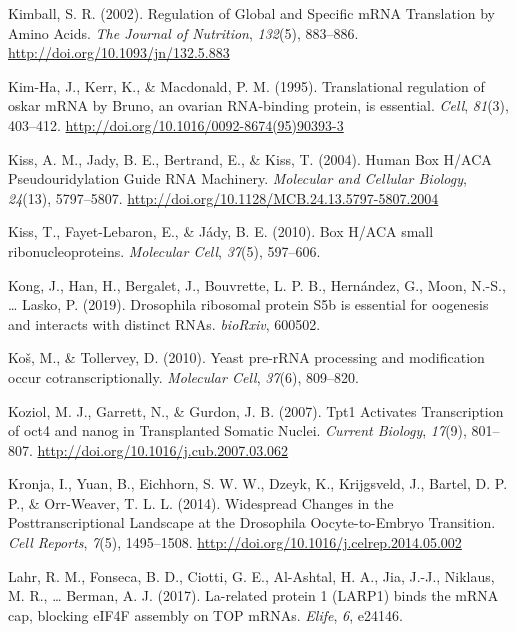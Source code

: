 \documentclass[12pt,twoside]{reedthesis}
\newlength{\cslhangindent}
\newenvironment{cslreferences}%
  {\setlength{\parindent}{0pt}%
  \everypar{\setlength{\hangindent}{\cslhangindent}}\ignorespaces}%
  {\par}
\begin{document}
\begin{cslreferences}
\leavevmode\hypertarget{ref-kimballRegulationGlobalSpecific2002}{}%
Kimball, S. R. (2002). Regulation of Global and Specific mRNA Translation by Amino Acids. \emph{The Journal of Nutrition}, \emph{132}(5), 883--886. \url{http://doi.org/10.1093/jn/132.5.883}

\leavevmode\hypertarget{ref-Kim-Ha1995i}{}%
Kim-Ha, J., Kerr, K., \& Macdonald, P. M. (1995). Translational regulation of oskar mRNA by Bruno, an ovarian RNA-binding protein, is essential. \emph{Cell}, \emph{81}(3), 403--412. \url{http://doi.org/10.1016/0092-8674(95)90393-3}

\leavevmode\hypertarget{ref-Kiss2004c}{}%
Kiss, A. M., Jady, B. E., Bertrand, E., \& Kiss, T. (2004). Human Box H/ACA Pseudouridylation Guide RNA Machinery. \emph{Molecular and Cellular Biology}, \emph{24}(13), 5797--5807. \url{http://doi.org/10.1128/MCB.24.13.5797-5807.2004}

\leavevmode\hypertarget{ref-Kiss2010}{}%
Kiss, T., Fayet-Lebaron, E., \& Jády, B. E. (2010). Box H/ACA small ribonucleoproteins. \emph{Molecular Cell}, \emph{37}(5), 597--606.

\leavevmode\hypertarget{ref-Kong2019}{}%
Kong, J., Han, H., Bergalet, J., Bouvrette, L. P. B., Hernández, G., Moon, N.-S., \ldots{} Lasko, P. (2019). Drosophila ribosomal protein S5b is essential for oogenesis and interacts with distinct RNAs. \emph{bioRxiv}, 600502.

\leavevmode\hypertarget{ref-Kos2010}{}%
Koš, M., \& Tollervey, D. (2010). Yeast pre-rRNA processing and modification occur cotranscriptionally. \emph{Molecular Cell}, \emph{37}(6), 809--820.

\leavevmode\hypertarget{ref-koziolTpt1ActivatesTranscription2007}{}%
Koziol, M. J., Garrett, N., \& Gurdon, J. B. (2007). Tpt1 Activates Transcription of oct4 and nanog in Transplanted Somatic Nuclei. \emph{Current Biology}, \emph{17}(9), 801--807. \url{http://doi.org/10.1016/j.cub.2007.03.062}

\leavevmode\hypertarget{ref-Kronja2014}{}%
Kronja, I., Yuan, B., Eichhorn, S. W. W., Dzeyk, K., Krijgsveld, J., Bartel, D. P. P., \& Orr-Weaver, T. L. L. (2014). Widespread Changes in the Posttranscriptional Landscape at the Drosophila Oocyte-to-Embryo Transition. \emph{Cell Reports}, \emph{7}(5), 1495--1508. \url{http://doi.org/10.1016/j.celrep.2014.05.002}

\leavevmode\hypertarget{ref-Lahr2017b}{}%
Lahr, R. M., Fonseca, B. D., Ciotti, G. E., Al-Ashtal, H. A., Jia, J.-J., Niklaus, M. R., \ldots{} Berman, A. J. (2017). La-related protein 1 (LARP1) binds the mRNA cap, blocking eIF4F assembly on TOP mRNAs. \emph{Elife}, \emph{6}, e24146.


\end{cslreferences}
\end{document}
